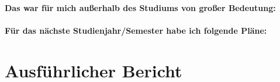 \documentclass[]{scrartcl}
\begin{document}
\paragraph{Das war für mich außerhalb des Studiums von großer Bedeutung:}

\paragraph{Für das nächste Studienjahr/Semester habe ich folgende Pläne:}

\section*{Ausführlicher Bericht}
\end{document}
